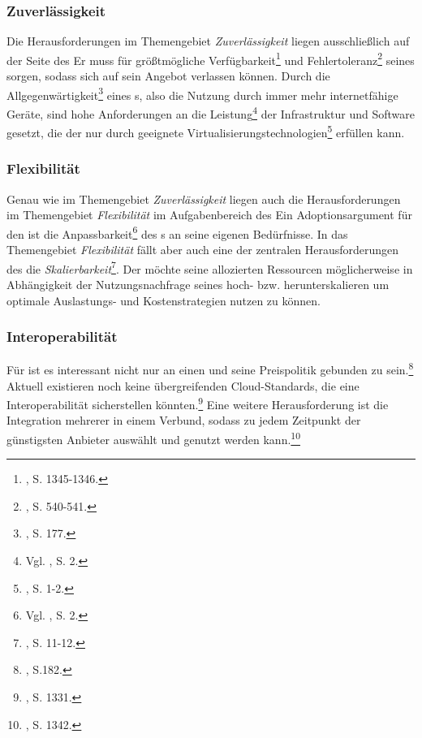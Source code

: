 \subsubsection{Zuverlässigkeit}
Die Herausforderungen im Themengebiet \emph{Zuverlässigkeit} liegen ausschließlich auf der Seite des \CSPsDot Er muss für größtmögliche Verfügbarkeit\footnote{\cite{He.2012}, S. 1345-1346.} und Fehlertoleranz\footnote{\cite{Zheng.2012}, S. 540-541.} seines \CSs sorgen, sodass \CSU sich auf sein Angebot verlassen können.
\newline
Durch die Allgegenwärtigkeit\footnote{\cite{Marston.2011}, S. 177.} eines \Cs s, also die Nutzung durch immer mehr internetfähige Geräte, sind hohe Anforderungen an die Leistung\footnote{Vgl. \cite{Liu.2012}, S. 2.} der \CC Infrastruktur und Software gesetzt, die der \CSP nur durch geeignete Virtualisierungstechnologien\footnote{\cite{Xiao.2012}, S. 1-2.} erfüllen kann.

\subsubsection{Flexibilität}
Genau wie im Themengebiet \emph{Zuverlässigkeit} liegen auch die Herausforderungen im Themengebiet \emph{Flexibilität} im Aufgabenbereich des \CSPsDot
Ein Adoptionsargument für den \CSU ist die Anpassbarkeit\footnote{Vgl. \cite{Ackermann.2012}, S. 2.} des \Cs s an seine eigenen Bedürfnisse.
\newline
In das Themengebiet \emph{Flexibilität} fällt aber auch eine der zentralen Herausforderungen des \CCComma die \emph{Skalierbarkeit}\footnote{\cite{Xiao.2012}, S. 11-12.}. Der \CSU möchte seine allozierten Ressourcen möglicherweise in Abhängigkeit der Nutzungsnachfrage seines \CSs hoch- bzw. herunterskalieren um optimale Auslastungs- und Kostenstrategien nutzen zu können.

\subsubsection{Interoperabilität}
Für \CSU ist es interessant nicht nur an einen \CSP und seine Preispolitik gebunden zu sein.\footnote{\cite{Marston.2011}, S.182.} Aktuell existieren noch keine übergreifenden Cloud-Standards, die eine Interoperabilität sicherstellen könnten.\footnote{\cite{Villegas.2012}, S. 1331.} Eine weitere Herausforderung ist die Integration mehrerer \CSP in einem Verbund, sodass zu jedem Zeitpunkt der günstigsten Anbieter auswählt und genutzt werden kann.\footnote{\cite{Villegas.2012}, S. 1342.}

